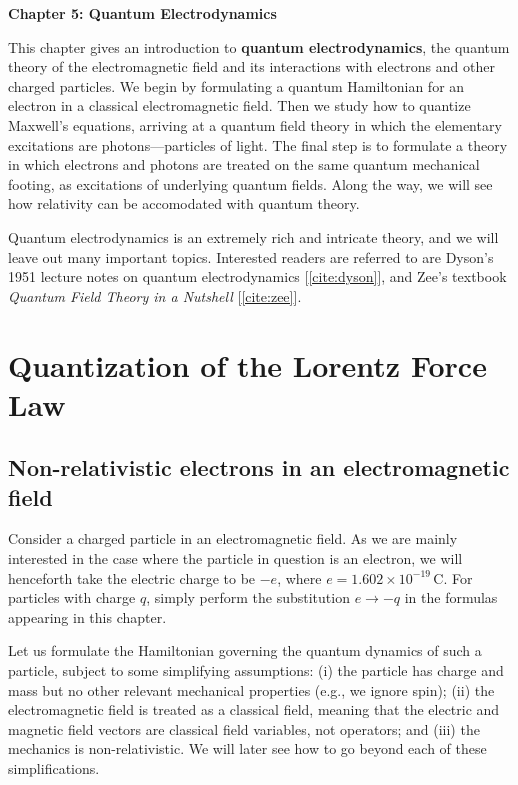 \documentclass[prx,12pt]{revtex4-2}
\begin{document}
\setcounter{page}{90}

\begin{center}
{\Large \textbf{Chapter 5: Quantum Electrodynamics}}
\end{center}


This chapter gives an introduction to \textbf{quantum
  electrodynamics}, the quantum theory of the electromagnetic field
and its interactions with electrons and other charged particles.  We
begin by formulating a quantum Hamiltonian for an electron in a
classical electromagnetic field.  Then we study how to quantize
Maxwell's equations, arriving at a quantum field theory in which the
elementary excitations are photons---particles of light.  The final
step is to formulate a theory in which electrons and photons are
treated on the same quantum mechanical footing, as excitations of
underlying quantum fields.  Along the way, we will see how relativity
can be accomodated with quantum theory.

Quantum electrodynamics is an extremely rich and intricate theory, and
we will leave out many important topics.  Interested readers are
referred to are Dyson's 1951 lecture notes on quantum electrodynamics
[\ref{cite:dyson}], and Zee's textbook \textit{Quantum Field Theory in
  a Nutshell} [\ref{cite:zee}].

\section{Quantization of the Lorentz Force Law}

\subsection{Non-relativistic electrons in an electromagnetic field}
\label{sec:nonrel}

Consider a charged particle in an electromagnetic field.  As we are
mainly interested in the case where the particle in question is an
electron, we will henceforth take the electric charge to be $-e$,
where $e = 1.602\times10^{-19}\,\mathrm{C}$.  For particles with
charge $q$, simply perform the substitution $e \rightarrow -q$ in the
formulas appearing in this chapter.

Let us formulate the Hamiltonian governing the quantum dynamics of
such a particle, subject to some simplifying assumptions: (i) the
particle has charge and mass but no other relevant mechanical
properties (e.g., we ignore spin); (ii) the electromagnetic field is
treated as a classical field, meaning that the electric and magnetic
field vectors are classical field variables, not operators; and (iii)
the mechanics is non-relativistic.  We will later see how to go beyond
each of these simplifications.
\end{document}

